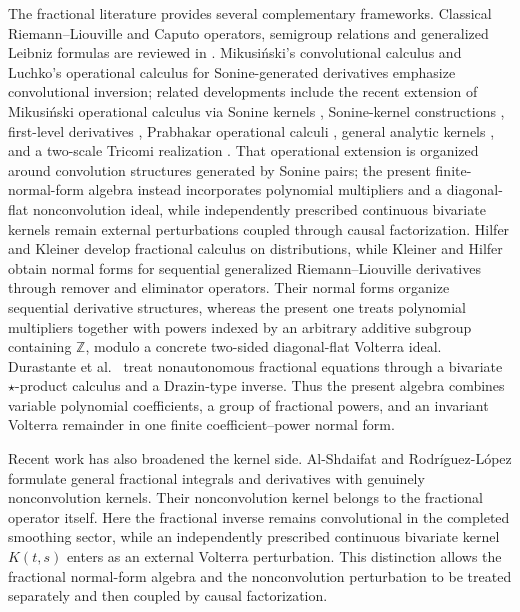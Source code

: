 \documentclass[11pt]{article}
\numberwithin{equation}{section}
\theoremstyle{definition}
\theoremstyle{remark}
\newcommand{\Z}{\mathbb Z}
\begin{document}
The fractional literature provides several complementary frameworks. Classical Riemann--Liouville and Caputo operators, semigroup relations and generalized Leibniz formulas are reviewed in \cite{Kilbas2006,Osler1970,Podlubny1999,Samko1993}. Mikusi\'nski's convolutional calculus \cite{Mikusinski1959} and Luchko's operational calculus for Sonine-generated derivatives \cite{Luchko2021,Luchko2022} emphasize convolutional inversion; related developments include the recent extension of Mikusi\'nski operational calculus via Sonine kernels \cite{GuzogluOperational2025}, Sonine-kernel constructions \cite{Ortigueira2024}, first-level derivatives \cite{Alkandari2024}, Prabhakar operational calculi \cite{RaniFernandez2022a,RaniFernandez2022b}, general analytic kernels \cite{Fernandez2019}, and a two-scale Tricomi realization \cite{Colombaro2026}. That operational extension is organized around convolution structures generated by Sonine pairs; the present finite-normal-form algebra instead incorporates polynomial multipliers and a diagonal-flat nonconvolution ideal, while independently prescribed continuous bivariate kernels remain external perturbations coupled through causal factorization. Hilfer and Kleiner \cite{HilferKleiner2024} develop fractional calculus on distributions, while Kleiner and Hilfer \cite{Kleiner2022} obtain normal forms for sequential generalized Riemann--Liouville derivatives through remover and eliminator operators. Their normal forms organize sequential derivative structures, whereas the present one treats polynomial multipliers together with powers indexed by an arbitrary additive subgroup containing $\Z$, modulo a concrete two-sided diagonal-flat Volterra ideal. Durastante et al.\ \cite{Durastante2026} treat nonautonomous fractional equations through a bivariate $\star$-product calculus and a Drazin-type inverse. Thus the present algebra combines variable polynomial coefficients, a group of fractional powers, and an invariant Volterra remainder in one finite coefficient--power normal form.

Recent work has also broadened the kernel side. Al-Shdaifat and Rodr\'iguez-L\'opez \cite{AlShdaifat2025} formulate general fractional integrals and derivatives with genuinely nonconvolution kernels. Their nonconvolution kernel belongs to the fractional operator itself. Here the fractional inverse remains convolutional in the completed smoothing sector, while an independently prescribed continuous bivariate kernel $K(t,s)$ enters as an external Volterra perturbation. This distinction allows the fractional normal-form algebra and the nonconvolution perturbation to be treated separately and then coupled by causal factorization.
\end{document}
